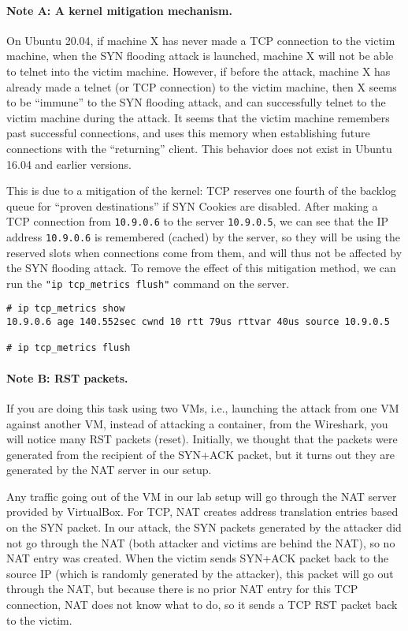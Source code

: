 \paragraph{Note A: A kernel mitigation mechanism.} On Ubuntu 20.04, if machine X
has never made a TCP connection to the victim machine, when the SYN flooding 
attack is launched, machine X will not be able to telnet into the 
victim machine. However, if before the attack, machine X
has already made a telnet (or TCP connection) to the victim machine, then X 
seems to be ``immune'' to the SYN flooding attack, and can
successfully telnet to the victim machine during the attack. 
It seems that the victim machine remembers past successful 
connections, and uses this memory when establishing
future connections with the ``returning'' client. 
This behavior does not exist in Ubuntu 16.04 and earlier versions.

This is due to a mitigation of the kernel: 
TCP reserves one fourth of the backlog queue for ``proven destinations'' 
if SYN Cookies are disabled. After making a TCP connection
from \texttt{10.9.0.6} to the server \texttt{10.9.0.5}, we can 
see that the IP address \texttt{10.9.0.6} is remembered (cached)
by the server, so they will be using the reserved slots
when connections come from them, and will thus not be 
affected by the SYN flooding attack.
To remove the effect of this mitigation method, we can 
run the \texttt{"ip tcp\_metrics flush"} command on
the server. 

\begin{lstlisting}
# ip tcp_metrics show
10.9.0.6 age 140.552sec cwnd 10 rtt 79us rttvar 40us source 10.9.0.5

# ip tcp_metrics flush
\end{lstlisting}


\paragraph{Note B: RST packets.} 
If you are doing this task using two VMs, i.e., launching the attack from one VM
against another VM, instead of attacking a container, from the Wireshark,
you will notice many RST packets (reset). Initially, we thought that 
the packets were generated from the recipient of the SYN+ACK packet, 
but it turns out they are generated by the 
NAT server in our setup. 

Any traffic going out of the VM in our lab setup will go through the NAT server
provided by VirtualBox. For TCP, NAT creates address translation 
entries based on the SYN packet. 
In our attack, the SYN packets generated 
by the attacker did not go through the NAT (both attacker and victims are behind the 
NAT), so no NAT entry was created. When the victim sends SYN+ACK packet back to the
source IP (which is randomly generated by the attacker), this packet will 
go out through the NAT, but because there is no prior NAT entry
for this TCP connection, NAT does not know what to do,
so it sends a TCP RST packet back to the victim. 

